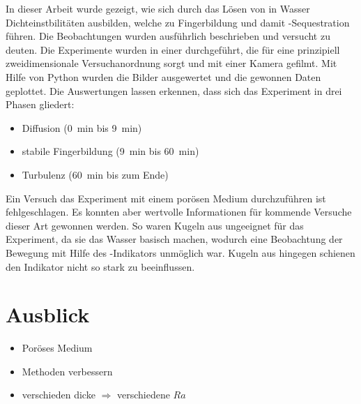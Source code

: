 
\label{cha:con}

In dieser Arbeit wurde gezeigt, wie sich durch das Lösen von \COT in Wasser Dichteinstbilitäten ausbilden, welche zu Fingerbildung und damit \COT-Sequestration führen. Die Beobachtungen wurden ausführlich beschrieben und versucht zu deuten.
Die Experimente wurden in einer \HSC durchgeführt, die für eine prinzipiell zweidimensionale Versuchanordnung sorgt und mit einer Kamera gefilmt.
Mit Hilfe von Python wurden die Bilder ausgewertet und die gewonnen Daten geplottet.
Die Auswertungen lassen erkennen, dass sich das Experiment in drei Phasen gliedert:
\begin{itemize}
 \item Diffusion (\SI{0}{\minute} bis \SI{9}{\minute})
 \item stabile Fingerbildung (\SI{9}{\minute} bis \SI{60}{\minute})
 \item Turbulenz (\SI{60}{\minute} bis zum Ende) 
\end{itemize}


Ein Versuch das Experiment mit einem porösen Medium durchzuführen ist fehlgeschlagen. Es konnten aber wertvolle Informationen für kommende Versuche dieser Art gewonnen werden. So waren Kugeln aus \KNG ungeeignet für das Experiment, da sie das Wasser basisch machen, wodurch eine Beobachtung der \COT Bewegung mit Hilfe des \BCG-Indikators unmöglich war. Kugeln aus \BOG hingegen schienen den Indikator nicht so stark zu beeinflussen.

\section{Ausblick}
\begin{itemize}
 \item Poröses Medium
 \item Methoden verbessern
 \item verschieden dicke \HSCs $\Rightarrow$ verschiedene $Ra$
\end{itemize}
